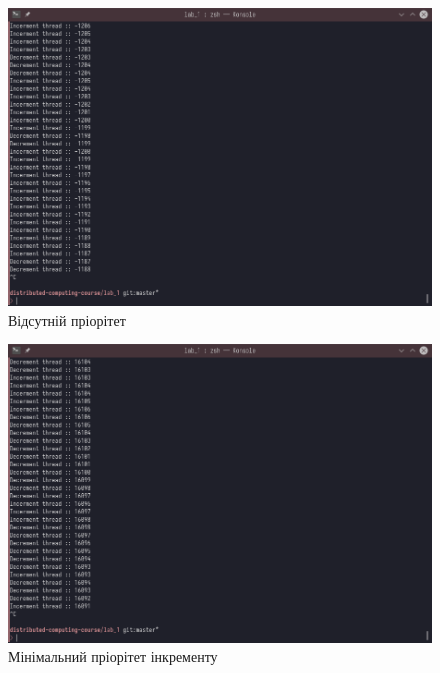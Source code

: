 \documentclass{udstu}
\begin{document}
\begin{figure}[!htp]
	\centering
	\includegraphics[scale=0.5]{PNG/no-prior.png}
	\caption{Відсутній пріорітет}
	\label{fig:figure1}
\end{figure}

\begin{figure}[!htp]
	\centering
	\includegraphics[scale=0.5]{PNG/min-prior-increment.png}
	\caption{Мінімальний пріорітет інкременту}
	\label{fig:figure1}
\end{figure}
\end{document}

